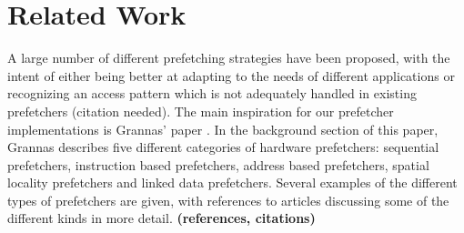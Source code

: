 
\section{Related Work}
\label{sec:relatedWork}

A large number of different prefetching strategies have been proposed,
with the intent of either being better at adapting to the needs of
different applications or recognizing an access pattern which is not
adequately handled in existing prefetchers (citation needed). The main
inspiration for our prefetcher implementations is Grannas' paper . In
the background section of this paper, Grannas describes five different
categories of hardware prefetchers: sequential prefetchers,
instruction based prefetchers, address based prefetchers, spatial
locality prefetchers and linked data prefetchers. Several examples of
the different types of prefetchers are given, with references to
articles discussing some of the different kinds in more detail.  {\bf
  (references, citations)}

